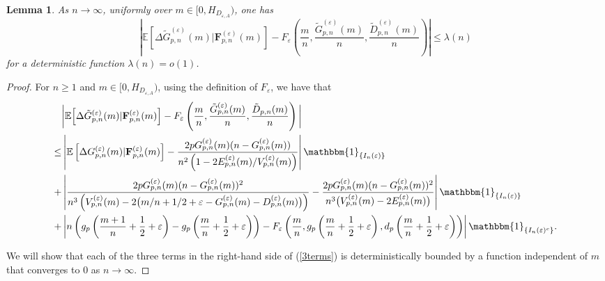 \documentclass[a4, 11pt]{article}
\numberwithin{equation}{section}
\theoremstyle{plain}
\newtheorem{lemma}[theorem]{Lemma}
\theoremstyle{definition}
\theoremstyle{remark}
\begin{document}
	\begin{lemma}\label{lm:trend:hyp}
		As $n\to \infty$, uniformly over $m\in \big[0,H_{D_{\varepsilon,A}}\big)$, one has
		$$\left\vert\mathbb{E}\left[\Delta \tilde{G}^{(\varepsilon)}_{p,n}(m) | {\mathbf{F}}^{(\varepsilon)}_{p,n}(m)  \right] -
		F_{\varepsilon}\left(\frac{m}{n},\frac{\tilde{G}^{(\varepsilon)}_{p,n}(m)}{n},\frac{\tilde{D}^{(\varepsilon)}_{p,n}(m)}{n}\right)\right\vert\leq \lambda(n)$$ 
		for a deterministic function $\lambda(n){=}o(1)$.
	\end{lemma}
	\begin{proof}
For $n\geq 1$ and $m\in \big[0,H_{D_{\varepsilon,A}}\big)$, using the definition of $F_{\varepsilon}$, we have that
\begin{align}
		&\bigg\vert\mathbb{E}\Big[\Delta \tilde{G}^{(\varepsilon)}_{p,n}(m) | {\mathbf{F}}^{(\varepsilon)}_{p,n}(m)  \Big] -	F_{\varepsilon}\left(\frac{m}{n},\frac{\tilde{G}^{(\varepsilon)}_{p,n}(m)}{n},\frac{\tilde D_{p,n}(m)}{n}\right) \bigg\vert \label{3terms}\\
			\leq & \left\vert\mathbb{E}\left[\Delta G_{p,n}^{(\varepsilon)}(m) | {\mathbf{F}}^{(\varepsilon)}_{p,n}(m)  \right] -\frac{2pG_{p,n}^{(\varepsilon)}(m)(n-G_{p,n}^{(\varepsilon)}(m))}{n^2\left(1-2E_{p,n}^{(\varepsilon)}(m)/V_{p,n}^{(\varepsilon)}(m)\right)}\right\vert\mathbbm{1}_{\{I_n(\varepsilon)\}} \notag \\	
	+& \left \vert \frac{2pG_{p,n}^{(\varepsilon)}(m)(n-G_{p,n}^{(\varepsilon)}(m))^2}{n^3\left(V_{p,n}^{(\varepsilon)}(m)-2\big(m/n+1/2+\varepsilon-G_{p,n}^{(\varepsilon)}(m)-D_{p,n}^{(\varepsilon)}(m)\big)\right)} -\frac{2pG_{p,n}^{(\varepsilon)}(m)(n-G_{p,n}^{(\varepsilon)}(m))^2}{n^3\big(V_{p,n}^{(\varepsilon)}(m)-2E_{p,n}^{(\varepsilon)}(m)\big)} \right\vert \mathbbm{1}_{\{I_n(\varepsilon)\}} \notag\\		
	+&\left\lvert n\left(g_p\left(\frac{m+1}{n}+\frac{1}{2}+\varepsilon\right)-g_p\left(\frac{m}{n}+\frac{1}{2}+\varepsilon\right)\right) -F_{\varepsilon}\left(\frac{m}{n},g_p\left(\frac{m}{n}+\frac{1}{2}+\varepsilon\right),d_p\left(\frac{m}{n}+\frac{1}{2}+\varepsilon\right)\right) \right\rvert \mathbbm{1}_{\{I_n(\varepsilon)^c\}}. \notag
\end{align}

We will show that each of the three terms in the right-hand side of (\ref{3terms}) is deterministically bounded by a function independent of $m$ that converges to 0 as $n \rightarrow \infty$.
		

\end{proof}
\end{document}
